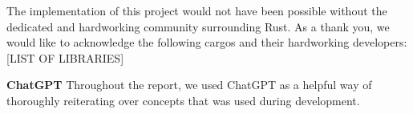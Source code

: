 The implementation of this project would not have been possible without the
dedicated and hardworking community surrounding Rust.
As a thank you, we would like to acknowledge the following cargos and their
hardworking developers:
[LIST OF LIBRARIES]

\textbf{ChatGPT}
Throughout the report, we used ChatGPT as a helpful way of thoroughly
reiterating over concepts that was used during development.